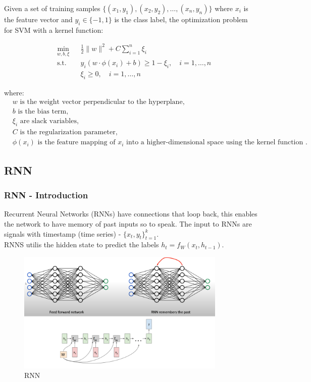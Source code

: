 \documentclass[12pt]{report}
\begin{document}
Given a set of training samples $\{(x_1, y_1), (x_2, y_2), \ldots, (x_n, y_n)\}$ where $x_i$ is the feature vector and $y_i \in \{-1, 1\}$ is the class label, the optimization problem for SVM with a kernel function:


\begin{align*}
	& \underset{w, b, \xi}{\text{min}}
	& & \frac{1}{2} \|w\|^2 + C \sum_{i=1}^{n} \xi_i \\
	& \text{s.t.}
	& & y_i (w \cdot \phi(x_i) + b) \geq 1 - \xi_i, \quad i = 1, \ldots, n \\
	& & & \xi_i \geq 0, \quad i = 1, \ldots, n
\end{align*}


where:
\begin{align*}
	&w  \text{ is the weight vector perpendicular to the hyperplane}, \\
	&b  \text{ is the bias term}, \\
	&\xi_i  \text{ are slack variables}, \\
	&C  \text{ is the regularization parameter}, \\
	&\phi(x_i)  \text{ is the feature mapping of } x_i \text{ into a higher-dimensional space using the kernel function }.
\end{align*}

\newpage
\subsection{RNN}

\subsubsection{RNN - Introduction}

Recurrent Neural Networks (RNNs) have connections that loop back, this enables the network to have memory of past inputs so to speak. The input to RNNs are signals with timestamp (time series) - $\{x_t, y_t \}_{t=1}^k$.\\

RNNS utilis the hidden state to predict the labels $h_t = f_{W}(x_t, h_{t-1})$.\\
\begin{figure}[H]\centering\includegraphics[width=10cm]{RNN.png}\caption{RNN}\end{figure}
\end{document}
